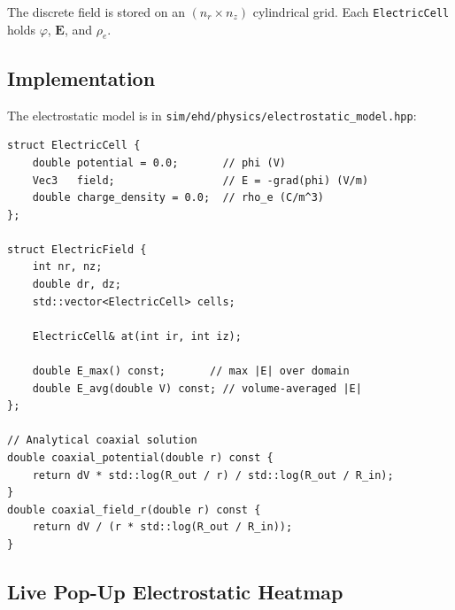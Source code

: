 \documentclass[11pt,a4paper]{article}
\begin{document}
The discrete field is stored on an $(n_r \times n_z)$ cylindrical grid.
Each \texttt{ElectricCell} holds $\varphi$, $\mathbf{E}$, and $\rho_e$.

\subsection{Implementation}

The electrostatic model is in
\texttt{sim/ehd/physics/electrostatic\_model.hpp}:

\begin{lstlisting}[style=cpp,title={\textbf{ElectricField storage and analytical baseline}}]
struct ElectricCell {
    double potential = 0.0;       // phi (V)
    Vec3   field;                 // E = -grad(phi) (V/m)
    double charge_density = 0.0;  // rho_e (C/m^3)
};

struct ElectricField {
    int nr, nz;
    double dr, dz;
    std::vector<ElectricCell> cells;

    ElectricCell& at(int ir, int iz);

    double E_max() const;       // max |E| over domain
    double E_avg(double V) const; // volume-averaged |E|
};

// Analytical coaxial solution
double coaxial_potential(double r) const {
    return dV * std::log(R_out / r) / std::log(R_out / R_in);
}
double coaxial_field_r(double r) const {
    return dV / (r * std::log(R_out / R_in));
}
\end{lstlisting}

\subsection{Live Pop-Up Electrostatic Heatmap}
\end{document}
